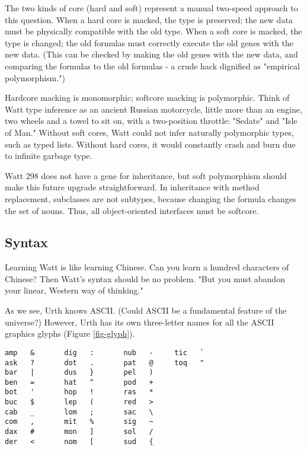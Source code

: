 \documentclass[10pt, nocopyrightspace]{sigplanconf}
\begin{document}
The two kinds of core (hard and soft) represent a manual
two-speed approach to this question.  When a hard core is macked,
the type is preserved; the new data must be physically compatible
with the old type.  When a soft core is macked, the type is
changed; the old formulas must correctly execute the old genes
with the new data.  (This can be checked by making the old genes
with the new data, and comparing the formulas to the old formulas -
a crude hack dignified as "empirical polymorphism.")

Hardcore macking is monomorphic; softcore macking is polymorphic.
Think of Watt type inference as an ancient Russian motorcycle,
little more than an engine, two wheels and a towel to sit on,
with a two-position throttle: "Sedate" and "Isle of Man."
Without soft cores, Watt could not infer naturally polymorphic
types, such as typed lists.  Without hard cores, it would
constantly crash and burn due to infinite garbage type.

Watt 298 does not have a gene for inheritance, but soft
polymorphism should make this future upgrade straightforward.  In
inheritance with method replacement, subclasses are not subtypes,
because changing the formula changes the set of nouns.  Thus, all
object-oriented interfaces must be softcore.

\subsection{Syntax}

Learning Watt is like learning Chinese.  Can you learn a hundred
characters of Chinese?  Then Watt's syntax should be no problem.
"But you must abandon your linear, Western way of thinking."

As we see, Urth knows ASCII.  (Could ASCII be a fundamental
feature of the universe?)  However, Urth has its own three-letter
names for all the ASCII graphics glyphs (Figure \ref{fig-glyph}).

\begin{figure*}
\begin{center}
\makebox[\textwidth]{\hrulefill}
\begin{verbatim}
amp   &       dig   :       nub   -     tic   `
ask   ?       dot   .       pat   @     toq   "
bar   |       dus   }       pel   )
ben   =       hat   ^       pod   +
bot   '       hop   !       ras   *
buc   $       lep   (       red   >
cab   _       lom   ;       sac   \
com   ,       mit   %       sig   ~
dax   #       mon   ]       sol   /
der   <       nom   [       sud   {
\end{verbatim}
\end{center}
\caption{Urth glyphs}
\label{fig-glyph}
\end{figure*}
\end{document}
